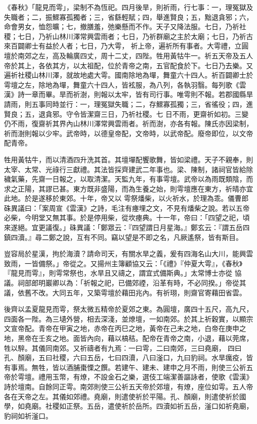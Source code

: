 
\begin{pinyinscope}

 《春秋》「龍見而雩」，梁制不為恆祀。四月後旱，則祈雨，行七事：一，理冤獄及失職者；二，振鰥寡孤獨者；三，省繇輕賦；四，舉進賢良；五，黜退貪邪；六，命會男女，恤怨曠；七，撤膳羞，弛樂懸而不作。天子又降法服。七日，乃祈社稷；七日，乃祈山林川澤常興雲雨者；七日，乃祈群廟之主於太廟；七日，乃祈古來百闢卿士有益於人者；七日，乃大雩，
 祈上帝，遍祈所有事者。大雩禮，立圓壇於南郊之左，高及輪廣四丈，周十二丈，四陛。牲用黃牯牛一。祈五天帝及五人帝於其上，各依其方，以太祖配，位於青帝之南，五官配食於下。七日乃去樂。又遍祈社稷山林川澤，就故地處大雩。國南除地為墠，舞童六十四人。祈百闢卿士於雩壇之左，除地為墠，舞童六十四人，皆袨服，為八列，各執羽翳。每列歌《雲漢》詩一章而畢。旱而祈澍，則報以太牢，皆有司行事。唯雩則不報。若郡國縣旱請雨，則五事同時並行：一，理冤獄失職；二，存鰥寡孤獨；三，省徭役；四，進賢良；五，退貪邪。守令皆潔齋三日，乃祈社稷。七
 日不雨，更齋祈如初。三變仍不雨，復齋祈其界內山林川澤常興雲雨者。祈而澍，亦各有報。陳氏亦因梁制，祈而澍則報以少牢。武帝時，以德皇帝配，文帝時，以武帝配。廢帝即位，以文帝配青帝。



 牲用黃牯牛，而以清酒四升洗其首。其壇墠配饗歌舞，皆如梁禮。天子不親奉，則太宰、太常、光祿行三獻禮。其法皆採齊建武二年事也。梁、陳制，諸祠官皆給除穢氣藥，先齋一日報之，以取清潔。天監九年，有事雩壇。武帝以為雨既類陰，而求之正陽，其謬已甚。東方既非盛陽，而為生養之始，則雩壇應在東方，祈晴亦宜此地。於是遂移於東郊。十年，帝又以
 雩祭燔柴，以火祈水，於理為乖。儀曹郎硃異議曰：「案周宣《雲漢》之詩，毛注有瘞埋之文，不見有燔柴之說。若以五帝必柴，今明堂又無其事。於是停用柴，從坎瘞典。十一年，帝曰：「四望之祀，頃來遂絕。宜更議復。」硃異議：「鄭眾云：『四望謂日月星海。』鄭玄云：『謂五岳四鎮四瀆。』尋二鄭之說，互有不同。竊以望是不即之名，凡厥遙祭，皆有斯目。



 豈容局於星漢，拘於海瀆？請命司天，有關水旱之義，爰有四海名山大川，能興雲致雨，一皆備祭。」帝從之。又揚州主簿顧協又云：「《禮》『仲夏大雩』，《春秋》『龍見而雩』，則雩常祭也，水旱且又禱之，謂宜式備斯典。」太常博士亦從
 協議。祠部郎明巖卿以為：「祈報之祀，已備郊禋，沿革有時，不必同揆。」帝從其議，依舊不改。大同五年，又築雩壇於藉田兆內。有祈珝，則齋官寄藉田省雲。



 後齊以孟夏龍見而雩，祭太微五精帝於夏郊之東。為圓壇，廣四十五尺，高九尺，四面各一陛。為三壝外營，相去深淺，並燎壇，一如南郊。於其上祈穀實，以顯宗文宣帝配。青帝在甲寅之地，赤帝在丙巳之地，黃帝在己未之地，白帝在庚申之地，黑帝在壬亥之地。面皆內向，藉以槁秸。配帝在青帝之南，小退，藉以莞席，牲以騂。其儀同南郊。又祈禱者有九焉：一曰雩，二曰南郊，三曰堯廟，
 四曰孔、顏廟，五曰社稷，六曰五岳，七曰四瀆，八曰滏口，九曰豹祠。水旱癘疫，皆有事焉。無牲，皆以酒脯棗慄之饌。若建午、建未、建申之月不雨，則使三公祈五帝於雩壇。禮用玉幣，有燎，不設金石之樂，選伎工端潔善謳詠者，使歌《雲漢》詩於壇南。自餘同正雩。南郊則使三公祈五天帝於郊壇，有燎，座位如雩。五人帝各在天帝之左。其儀如郊禮。堯廟，則遣使祈於平陽。孔、顏廟，則遣使祈於國學，如堯廟。社稷如正祭。五岳，遣使祈於岳所。四瀆如祈五岳，滏口如祈堯廟，豹祠如祈滏口。




\end{pinyinscope}
